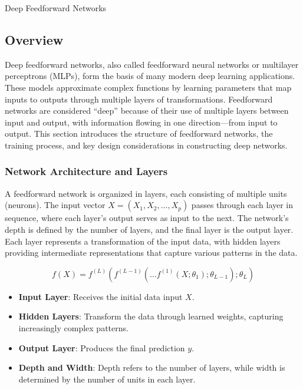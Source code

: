 \begin{notes}{Deep Feedforward Networks}
    \subsection*{Overview}

    Deep feedforward networks, also called feedforward neural networks or multilayer perceptrons (MLPs), form the basis of many modern deep learning applications. These models approximate complex functions 
    by learning parameters that map inputs to outputs through multiple layers of transformations. Feedforward networks are considered “deep” because of their use of multiple layers between input and output, 
    with information flowing in one direction—from input to output. This section introduces the structure of feedforward networks, the training process, and key design considerations in constructing deep networks.
    
    \subsubsection*{Network Architecture and Layers}
    
    A feedforward network is organized in layers, each consisting of multiple units (neurons). The input vector $X = (X_1, X_2, \ldots, X_p)$ passes through each layer in sequence, where each layer's output 
    serves as input to the next. The network's depth is defined by the number of layers, and the final layer is the output layer. Each layer represents a transformation of the input data, with hidden layers 
    providing intermediate representations that capture various patterns in the data.
    
    \[
    f(X) = f^{(L)}(f^{(L-1)}(\dots f^{(1)}(X; \theta_1); \theta_{L-1}); \theta_L)
    \]
    
    \begin{highlight}
        \begin{itemize}
            \item \textbf{Input Layer}: Receives the initial data input $X$.
            \item \textbf{Hidden Layers}: Transform the data through learned weights, capturing increasingly complex patterns.
            \item \textbf{Output Layer}: Produces the final prediction $y$.
            \item \textbf{Depth and Width}: Depth refers to the number of layers, while width is determined by the number of units in each layer.
        \end{itemize}
    \end{highlight}
    

\end{notes}
